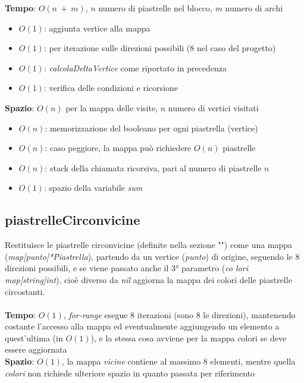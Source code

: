 \documentclass{article}
\begin{document}
\textbf{Tempo}: \(O(n\ +\ m)\), \(n\) numero di piastrelle nel blocco, \(m\) numero di archi
\begin{itemize}
  \item \(O(1)\): aggiunta vertice alla mappa
  \item \(O(1)\): per iterazione sulle direzioni possibili (8 nel caso del progetto)
  \item \(O(1)\): \textit{calcolaDeltaVertice} come riportato in precedenza
  \item \(O(1)\): verifica delle condizioni e ricorsione
\end{itemize}
\textbf{Spazio}: \(O(n)\) per la mappa delle visite, \(n\) numero di vertici visitati
\begin{itemize}
  \item \(O(n)\): memorizzazione del booleano per ogni piastrella (vertice)
  \item \(O(n)\): caso peggiore, la mappa può richiedere \(O(n)\) piastrelle
  \item \(O(n)\): stack della chiamata ricorsiva, pari al numero di piastrelle \(n\)
  \item \(O(1)\): spazio della variabile \textit{sum} 
\end{itemize}

\subsection{piastrelleCirconvicine}
Restituisce le piastrelle circonvicine (definite nella sezione "") come una mappa (\textit{map[punto]*Piastrella}), partendo da un vertice (\textit{punto}) di origine, seguendo le 8 direzioni possibili, e se viene passato anche il 3° parametro (\textit{co
lori map[string]int}), cioè diverso da \textit{nil} aggiorna la mappa dei colori delle piastrelle circostanti.\\ \\
\textbf{Tempo}: \(O(1)\), \textit{for-range} esegue 8 iterazioni (sono 8 le direzioni), mantenendo costante l'accesso alla mappa ed eventualmente aggiungendo un elemento a quest'ultima (in \(O(1)\)), e la stessa cosa avviene per la mappa colori se deve essere aggiornata\\
\textbf{Spazio}: \(O(1)\), la mappa \textit{vicine} contiene al massimo 8 elementi, mentre quella \textit{colori} non richiede ulteriore spazio in quanto passata per riferimento
\end{document}
